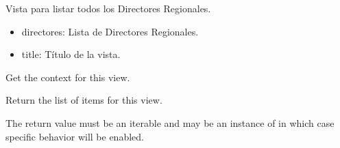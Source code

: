 \documentclass[letterpaper,10pt,spanish]{sphinxmanual}
\begin{document}
\begin{fulllineitems}

\pysigstartsignatures
{}
\pysigstopsignatures
\sphinxAtStartPar
Vista para listar todos los Directores Regionales.
\begin{description}
\begin{itemize}
\item {} 
\sphinxAtStartPar
directores: Lista de Directores Regionales.

\item {} 
\sphinxAtStartPar
title: Título de la vista.

\end{itemize}

\end{description}


\begin{fulllineitems}

\pysigstartsignatures
{}
\pysigstopsignatures
\end{fulllineitems}



\begin{fulllineitems}

\pysigstartsignatures
{}
\pysigstopsignatures
\sphinxAtStartPar
Get the context for this view.

\end{fulllineitems}



\begin{fulllineitems}

\pysigstartsignatures
{}
\pysigstopsignatures
\sphinxAtStartPar
Return the list of items for this view.

\sphinxAtStartPar
The return value must be an iterable and may be an instance of
 in which case  specific behavior will be enabled.


\end{fulllineitems}
\end{fulllineitems}
\end{document}
